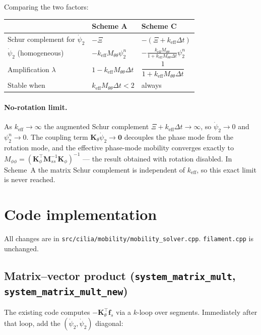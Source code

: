 \documentclass[11pt]{article}
\newcommand{\dt}{\Delta t}
\newcommand{\keff}{k_\mathrm{eff}}
\newcommand{\Mtt}{M_{\theta\theta}}
\newcommand{\Kth}{\mathbf{K}_\theta}
\newcommand{\Mss}{\mathbf{M}_{ss}}
\begin{document}
Comparing the two factors:
\begin{center}
\begin{tabular}{@{}lll@{}}
\toprule
 & Scheme A & Scheme C \\
\midrule
Schur complement for $\dot\psi_2$ & $-\Xi$ & $-(\Xi + \keff\dt)$ \\
$\dot\psi_2$ (homogeneous) & $-\keff\Mtt\psi_2^n$ &
  $\displaystyle-\frac{\keff\Mtt}{1+\keff\Mtt\dt}\psi_2^n$ \\[6pt]
Amplification $\lambda$ & $1 - \keff\Mtt\dt$
  & $\dfrac{1}{1+\keff\Mtt\dt}$ \\[6pt]
Stable when & $\keff\Mtt\dt < 2$ & always \\
\bottomrule
\end{tabular}
\end{center}

\paragraph{No-rotation limit.}
As $\keff\to\infty$ the augmented Schur complement
$\Xi+\keff\dt\to\infty$, so $\dot\psi_2\to0$ and $\psi_2^n\to0$.
The coupling term $\Kth\dot\psi_2\to\mathbf{0}$ decouples the phase
mode from the rotation mode, and the effective phase-mode mobility
converges exactly to $M_{\phi\phi}=(\mathbf{K}_\phi^\top\Mss^{-1}\mathbf{K}_\phi)^{-1}$
--- the result obtained with rotation disabled.  In Scheme~A the matrix
Schur complement is independent of $\keff$, so this exact limit is
never reached.

\section{Code implementation}

All changes are in \texttt{src/cilia/mobility/mobility\_solver.cpp}.
\texttt{filament.cpp} is unchanged.

\subsection*{Matrix--vector product (\texttt{system\_matrix\_mult},
             \texttt{system\_matrix\_mult\_new})}

The existing code computes $-\Kth^\top\mathbf{f}_s$ via a
$k$-loop over segments.  Immediately after that loop, add the
$(\dot\psi_2,\dot\psi_2)$ diagonal:
\end{document}
